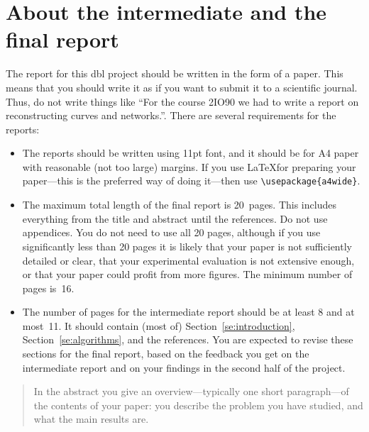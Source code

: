 \documentclass[11pt]{article}
\begin{document}
\section*{About the intermediate and the final report}
The report for this {\sc dbl} project should be written in the form of a paper.
This means that you should write it as if you want to submit it to a scientific
journal. Thus, do not write things like ``For the course 2IO90 we had to write a report
on reconstructing curves and networks.''. There are several requirements for
the reports:
\begin{itemize}
\item The reports should be written using 11\;pt font, and it should be for A4 paper 
      with reasonable (not too large) margins. If you use \LaTeX for preparing
      your paper---this is the preferred way of doing it---then use
      \verb#\usepackage{a4wide}#.
\item The maximum total length of the
      final report is 20~pages. This includes everything from the title and abstract until
      the references. Do not use appendices. You do not need to use all 20 pages,
      although if you use significantly less than 20 pages it is likely that
      your paper is not sufficiently detailed or clear, that your experimental evaluation is
      not extensive enough, or that your paper could profit from more figures.
      The minimum number of pages is~16.
\item The number of pages for the intermediate report should be at least 8 and at most~11.
      It should contain (most of) Section~\ref{se:introduction}, Section~\ref{se:algorithms},
      and the references. You are expected to revise these sections for the final report, based
      on the feedback you get on the intermediate report and on your findings in the second half
      of the project. 
\end{itemize}





\newpage

\maketitle

\begin{abstract}
In the abstract you give an overview---typically one short paragraph---of the contents of
your paper: you describe the problem you have studied, and what the main results are.
\end{abstract}
\end{document}
